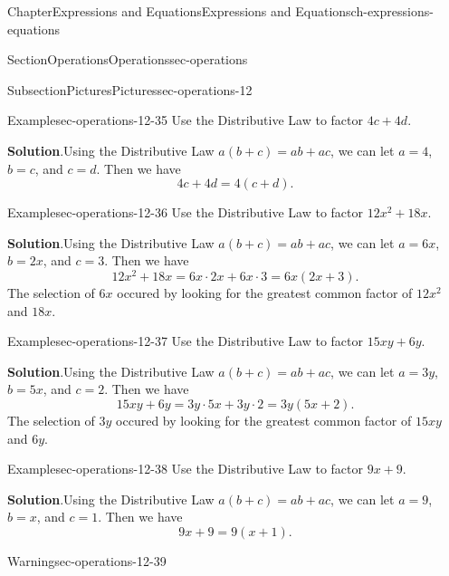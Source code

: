 \documentclass[twoside,11pt,]{book}
\newcommand{\blocktitlefont}{\relax}
\numberwithin{equation}{chapter}
\begin{document}
\begin{chapterptx}{Chapter}{Expressions and Equations}{}{Expressions and Equations}{}{}{ch-expressions-equations}
\begin{sectionptx}{Section}{Operations}{}{Operations}{}{}{sec-operations}
\begin{subsectionptx}{Subsection}{Pictures}{}{Pictures}{}{}{sec-operations-12}
\begin{example}{Example}{}{sec-operations-12-35}
Use the Distributive Law to factor \(4c + 4d\).%
\par\smallskip%
\noindent\textbf{\blocktitlefont Solution}.\hypertarget{sec-operations-12-35-2}{}\quad{}Using the Distributive Law \(a(b+c)=ab+ac\), we can let \(a=4\), \(b=c\), and \(c=d\). Then we have%
\begin{equation*}
4c + 4d = 4(c + d).
\end{equation*}
%
\end{example}
\begin{example}{Example}{}{sec-operations-12-36}%
Use the Distributive Law to factor \(12x^2 + 18x\).%
\par\smallskip%
\noindent\textbf{\blocktitlefont Solution}.\hypertarget{sec-operations-12-36-2}{}\quad{}Using the Distributive Law \(a(b+c)=ab+ac\), we can let \(a=6x\), \(b=2x\), and \(c=3\). Then we have%
\begin{equation*}
12x^2 + 18x = 6x \cdot 2x + 6x \cdot 3 = 6x(2x + 3).
\end{equation*}
The selection of \(6x\) occured by looking for the greatest common factor of \(12x^2\) and \(18x\).%
\end{example}
\begin{example}{Example}{}{sec-operations-12-37}%
Use the Distributive Law to factor \(15xy + 6y\).%
\par\smallskip%
\noindent\textbf{\blocktitlefont Solution}.\hypertarget{sec-operations-12-37-2}{}\quad{}Using the Distributive Law \(a(b+c)=ab+ac\), we can let \(a=3y\), \(b=5x\), and \(c=2\). Then we have%
\begin{equation*}
15xy + 6y = 3y \cdot 5x + 3y \cdot 2 = 3y(5x + 2).
\end{equation*}
The selection of \(3y\) occured by looking for the greatest common factor of \(15xy\) and \(6y\).%
\end{example}
\begin{example}{Example}{}{sec-operations-12-38}%
Use the Distributive Law to factor \(9x + 9\).%
\par\smallskip%
\noindent\textbf{\blocktitlefont Solution}.\hypertarget{sec-operations-12-38-2}{}\quad{}Using the Distributive Law \(a(b+c)=ab+ac\), we can let \(a=9\), \(b=x\), and \(c=1\). Then we have%
\begin{equation*}
9x + 9 = 9(x + 1).
\end{equation*}
%
\end{example}
\begin{warning}{Warning}{}{sec-operations-12-39}%

\end{warning}
\end{subsectionptx}
\end{sectionptx}
\end{chapterptx}
\end{document}
